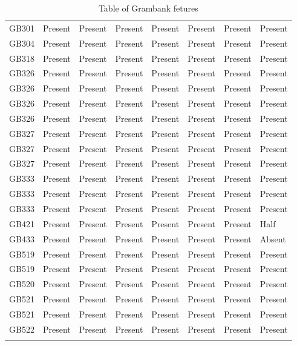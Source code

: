 \begin{longtable}{p{1.5cm}p{2.5cm}p{2.5cm}p{2.5cm}p{2.5cm}p{2.5cm}p{2.5cm}p{2.5cm}}
  GB301 & Present & Present & Present & Present & Present & Present & Present \\ 
  GB304 & Present & Present & Present & Present & Present & Present & Present \\ 
  GB318 & Present & Present & Present & Present & Present & Present & Present \\ 
  GB326 & Present & Present & Present & Present & Present & Present & Present \\ 
  GB326 & Present & Present & Present & Present & Present & Present & Present \\ 
  GB326 & Present & Present & Present & Present & Present & Present & Present \\ 
  GB326 & Present & Present & Present & Present & Present & Present & Present \\ 
  GB327 & Present & Present & Present & Present & Present & Present & Present \\ 
  GB327 & Present & Present & Present & Present & Present & Present & Present \\ 
  GB327 & Present & Present & Present & Present & Present & Present & Present \\ 
  GB333 & Present & Present & Present & Present & Present & Present & Present \\ 
  GB333 & Present & Present & Present & Present & Present & Present & Present \\ 
  GB333 & Present & Present & Present & Present & Present & Present & Present \\ 
  GB421 & Present & Present & Present & Present & Present & Present & Half \\ 
  GB433 & Present & Present & Present & Present & Present & Present & Absent \\ 
  GB519 & Present & Present & Present & Present & Present & Present & Present \\ 
  GB519 & Present & Present & Present & Present & Present & Present & Present \\ 
  GB520 & Present & Present & Present & Present & Present & Present & Present \\ 
  GB521 & Present & Present & Present & Present & Present & Present & Present \\ 
  GB521 & Present & Present & Present & Present & Present & Present & Present \\ 
  GB522 & Present & Present & Present & Present & Present & Present & Present \\ 
   \bottomrule
\caption{Table of Grambank fetures} 
\label{GB_features_table}
\end{longtable}
